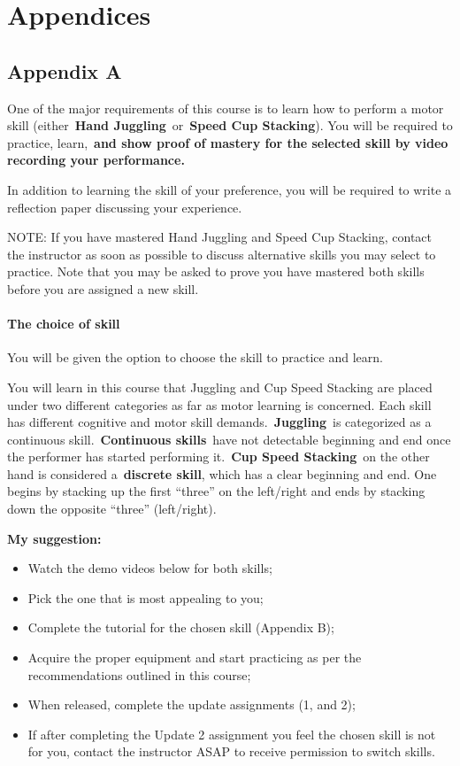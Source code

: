 \documentclass[
  letterpaper,
  DIV=11,
  numbers=noendperiod,
  oneside]{scrartcl}
\let\oldparagraph\paragraph
\renewcommand{\paragraph}[1]{\oldparagraph{#1}\mbox{}}
\begin{document}
\hypertarget{appendices}{%
\section{Appendices}\label{appendices}}

\hypertarget{appendix-a}{%
\subsection{Appendix A}\label{appendix-a}}

One of the major requirements of this course is to learn how to perform
a motor skill (either~\textbf{Hand Juggling}~or~\textbf{Speed Cup
Stacking}). You will be required to practice, learn,~\textbf{and show
proof of mastery for the selected skill by video recording your
performance.}

In addition to learning the skill of your preference, you will be
required to write a reflection paper discussing your experience.

NOTE: If you have mastered Hand Juggling and Speed Cup Stacking, contact
the instructor as soon as possible to discuss alternative skills you may
select to practice. Note that you may be asked to prove you have
mastered both skills before you are assigned a new skill.

\hypertarget{the-choice-of-skill}{%
\paragraph{The choice of skill}\label{the-choice-of-skill}}

You will be given the option to choose the skill to practice and learn.

You will learn in this course that Juggling and Cup Speed Stacking are
placed under two different categories as far as motor learning is
concerned. Each skill has different cognitive and motor skill
demands.~\textbf{Juggling}~is categorized as a continuous
skill.~\textbf{Continuous skills}~have not detectable beginning and end
once the performer has started performing it.~\textbf{Cup Speed
Stacking}~on the other hand is considered a~\textbf{discrete skill},
which has a clear beginning and end. One begins by stacking up the first
``three'' on the left/right and ends by stacking down the opposite
``three'' (left/right).

\textbf{My suggestion:}

\begin{itemize}
\item
  Watch the demo videos below for both skills;
\item
  Pick the one that is most appealing to you;
\item
  Complete the tutorial for the chosen skill (Appendix B);
\item
  Acquire the proper equipment and start practicing as per the
  recommendations outlined in this course;
\item
  When released, complete the update assignments (1, and 2);
\item
  If after completing the Update 2 assignment you feel the chosen skill
  is not for you, contact the instructor ASAP to receive permission to
  switch skills.
\end{itemize}
\end{document}
